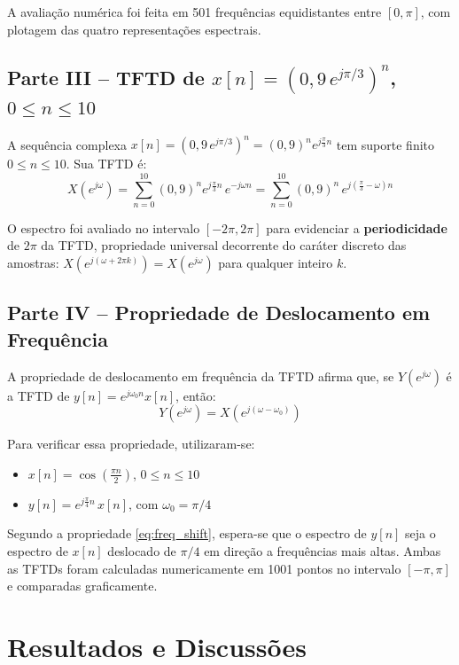 \documentclass[tcc]{classe_uftex/uftex}
\begin{document}
A avaliação numérica foi feita em 501 frequências equidistantes entre $[0, \pi]$, com plotagem das quatro representações espectrais.

\section{Parte III -- TFTD de $x[n] = (0{,}9\,e^{j\pi/3})^n$, $0 \leq n \leq 10$}

A sequência complexa $x[n] = (0{,}9\,e^{j\pi/3})^n = (0{,}9)^n e^{j\frac{\pi}{3}n}$ tem suporte finito $0 \leq n \leq 10$. Sua TFTD é:
\begin{equation}
  X(e^{j\omega}) = \sum_{n=0}^{10} (0{,}9)^n e^{j\frac{\pi}{3}n}\, e^{-j\omega n}
  = \sum_{n=0}^{10} (0{,}9)^n\, e^{j\left(\frac{\pi}{3} - \omega\right)n}
  \label{eq:tftd_parte3}
\end{equation}

O espectro foi avaliado no intervalo $[-2\pi, 2\pi]$ para evidenciar a \textbf{periodicidade} de $2\pi$ da TFTD, propriedade universal decorrente do caráter discreto das amostras: $X(e^{j(\omega + 2\pi k)}) = X(e^{j\omega})$ para qualquer inteiro $k$.

\section{Parte IV -- Propriedade de Deslocamento em Frequência}

A propriedade de deslocamento em frequência da TFTD afirma que, se $Y(e^{j\omega})$ é a TFTD de $y[n] = e^{j\omega_0 n} x[n]$, então:
\begin{equation}
  Y(e^{j\omega}) = X(e^{j(\omega - \omega_0)})
  \label{eq:freq_shift}
\end{equation}

Para verificar essa propriedade, utilizaram-se:
\begin{itemize}
  \item $x[n] = \cos\!\left(\frac{\pi n}{2}\right)$, $0 \leq n \leq 10$
  \item $y[n] = e^{j\frac{\pi}{4}n}\, x[n]$, com $\omega_0 = \pi/4$
\end{itemize}
Segundo a propriedade \eqref{eq:freq_shift}, espera-se que o espectro de $y[n]$ seja o espectro de $x[n]$ deslocado de $\pi/4$ em direção a frequências mais altas. Ambas as TFTDs foram calculadas numericamente em 1001 pontos no intervalo $[-\pi, \pi]$ e comparadas graficamente.

\chapter{Resultados e Discussões}
\end{document}
